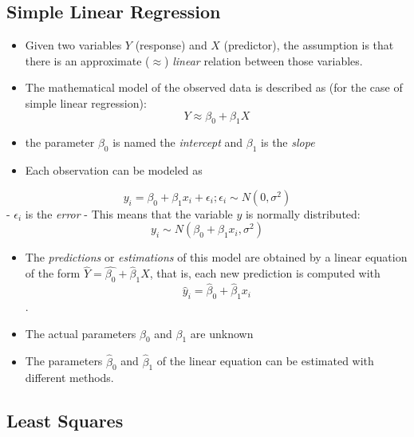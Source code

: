 \documentclass[]{book}
\providecommand{\tightlist}{%
  \setlength{\itemsep}{0pt}\setlength{\parskip}{0pt}}
\begin{document}
\subsection{Simple Linear Regression}\label{simple-linear-regression}

\begin{itemize}
\item
  Given two variables \(Y\) (response) and \(X\) (predictor), the
  assumption is that there is an approximate (\(\approx\)) \emph{linear}
  relation between those variables.
\item
  The mathematical model of the observed data is described as (for the
  case of simple linear regression): \[ Y \approx \beta_0 + \beta_1 X\]
\item
  the parameter \(\beta_0\) is named the \emph{intercept} and
  \(\beta_1\) is the \emph{slope}
\item
  Each observation can be modeled as
\end{itemize}

\[y_i = \beta_0 + \beta_1 x_i + \epsilon_i;
\epsilon_i \sim N(0,\sigma^2)\] - \(\epsilon_i\) is the \emph{error} -
This means that the variable \(y\) is normally distributed:
\[ y_i \sim N( \beta_0 + \beta_1 x_i, \sigma^2) \]

\begin{itemize}
\tightlist
\item
  The \emph{predictions} or \emph{estimations} of this model are
  obtained by a linear equation of the form
  \(\hat{Y}=\hat{\beta_0} + \hat{\beta}_1X\), that is, each new
  prediction is computed with
  \[\hat{y}_i = \hat{\beta}_0 + \hat{\beta}_1x_i \].
\item
  The actual parameters \(\beta_0\) and \(\beta_1\) are unknown
\item
  The parameters \(\hat{\beta}_0\) and \(\hat{\beta}_1\) of the linear
  equation can be estimated with different methods.
\end{itemize}

\subsection{Least Squares}\label{least-squares}
\end{document}
